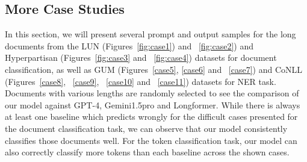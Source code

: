 \documentclass[11pt]{article}
\begin{document}
        



\subsection{More Case Studies}
\label{app:cases}

In this section, we will present several prompt and output samples for the long documents from the LUN (Figures~\ref{fig:case1}) and ~\ref{fig:case2}) and Hyperpartisan (Figures~\ref{fig:case3} and ~\ref{fig:case4}) datasets for document classification, as well as GUM (Figures~\ref{case5}, \ref{case6} and ~\ref{case7}) and CoNLL (Figures~\ref{case8}, ~\ref{case9}, ~\ref{case10} and ~\ref{case11}) datasets for NER task. Documents with various lengths are randomly selected to see the comparison of our model against GPT-4, Gemini1.5pro and Longformer. While there is always at least one baseline which predicts wrongly for the difficult cases presented for the document classification task, we can observe that our model consistently classifies those documents well. For the token classification task, our model can also correctly classify more tokens than each baseline across the shown cases.
\end{document}
